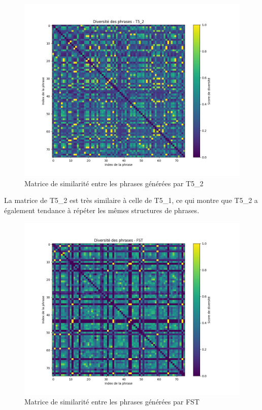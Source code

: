 \documentclass[11pt]{article}
\begin{document}
\begin{figure}[H]
\centering
\includegraphics[width=1\textwidth]{../plot/diversity_matrix_t5_2.png}
\caption{Matrice de similarité entre les phrases générées par T5\_2}
\end{figure}

\vspace{5mm}

La matrice de T5\_2 est très similaire à celle de T5\_1, ce qui montre que T5\_2 a également tendance à répéter les mêmes structures de phrases.

\vspace{5mm}

\begin{figure}[H]
\centering
\includegraphics[width=1\textwidth]{../plot/diversity_matrix_fst.png}
\caption{Matrice de similarité entre les phrases générées par FST}
\end{figure}
\end{document}
